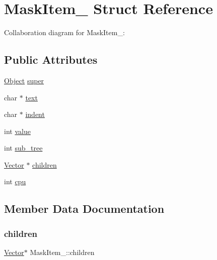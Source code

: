 \hypertarget{structMaskItem__}{}\section{Mask\+Item\+\_\+ Struct Reference}
\label{structMaskItem__}


Collaboration diagram for Mask\+Item\+\_\+\+:
\subsection*{Public Attributes}
\begin{DoxyCompactItemize}
\item 
\hyperlink{Object_8h_a32b67ad7134cd31b5ec5ed9c6a2d3978}{Object} \hyperlink{structMaskItem___a9cbc4c45d53d97a7df10f55e70e493a2}{super}
\item 
char $\ast$ \hyperlink{structMaskItem___a996b7904d3096800ca66449a5e6b66b6}{text}
\item 
char $\ast$ \hyperlink{structMaskItem___ab489d830ff2d9fa1c840cc57d579a380}{indent}
\item 
int \hyperlink{structMaskItem___a2c23a5bfb38f67ca4853a5ffadd28da5}{value}
\item 
int \hyperlink{structMaskItem___a58a0151d59515b75ac1a9040b0587aaa}{sub\+\_\+tree}
\item 
\hyperlink{Vector_8h_a8297b82ce917cd21838596b7e3a7faa8}{Vector} $\ast$ \hyperlink{structMaskItem___a0f7a0cb1cc9a59ef0e64c0bccdd3d79d}{children}
\item 
int \hyperlink{structMaskItem___a37a9643f3a285757d6674957d403abe6}{cpu}
\end{DoxyCompactItemize}


\subsection{Member Data Documentation}
\mbox{\label{structMaskItem___a0f7a0cb1cc9a59ef0e64c0bccdd3d79d}} 
\subsubsection{\texorpdfstring{children}{children}}
{\footnotesize\ttfamily \hyperlink{Vector_8h_a8297b82ce917cd21838596b7e3a7faa8}{Vector}$\ast$ Mask\+Item\+\_\+\+::children}

